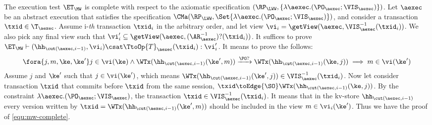 The execution test $\ET_{\MW}$ is complete with respect to 
the axiomatic specification $(\RP_{\LWW}, \{\lambda \aexec.(\PO_{\aexec} ; \VIS_{\aexec})\})$. 
Let $\aexec$ be an abstract execution that satisfies the specification
$\CMa(\RP_{\LWW}, \Set{\lambda \aexec.(\PO_{\aexec} ; \VIS_{\aexec})})$, 
and consider a transaction $\txid \in \T_{\aexec}$. 
Assume i-\emph{th} transaction \( \txid_i \) in the arbitrary order,
and let view \( \vi_{i} = \getView(\aexec, \VIS^{-1}_{\aexec}(\txid_{i}) ) \).
We also pick any final view such that \( \vi'_{i} \subseteq \getView(\aexec, (\AR^{-1}_{\aexec})?(\txid_{i}) ) \).
It suffices to prove \( \ET_\MW \vdash (\hh_{\cut(\aexec, i-1)}, \vi_i ) \csat  \TtoOp{T}_{\aexec}(\txid_{i}) : \vi'_{i} \).
It means to prove the follows:
\begin{equation}
\label{equ:mw-complete}
\begin{array}{@{}l@{}}
    \fora{j,m,\ke, \ke' } j \in \vi(\ke)  
    \wedge \WTx(\hh_{\cut(\aexec, i-1)}(\ke', m)) \xrightarrow{\PO?} \WTx(\hh_{\cut(\aexec, i-1)}(\ke, j))  
    \implies m \in \vi(\ke')
\end{array}
\end{equation}
Assume \( j \) and \( \ke' \) such that \( j \in \vi(\ke')\), which means \( \WTx(\hh_{\cut(\aexec, i-1)}(\ke', j)) \in \VIS^{-1}_{\aexec}(\txid_{i}) \).
Now let consider transaction \( \txid \) that commits before \( \txid \) from the same session, \ie \( \txid \toEdge{\SO} \WTx(\hh_{\cut(\aexec, i-1)}(\ke, j)) \).
By the constraint \( \lambda \aexec.(\PO_{\aexec} ; \VIS_{\aexec}) \), the transaction \( \txid \in \VIS^{-1}_{\aexec}(\txid_{i}) \).
It means that in the kv-store \(  \hh_{\cut(\aexec, i-1)} \) every version written by \( \txid =  \WTx(\hh_{\cut(\aexec, i-1)}(\ke', m)) \) should be included in the view \( m \in \vi_i(\ke') \).
Thus we have the proof of \cref{equ:mw-complete}.
